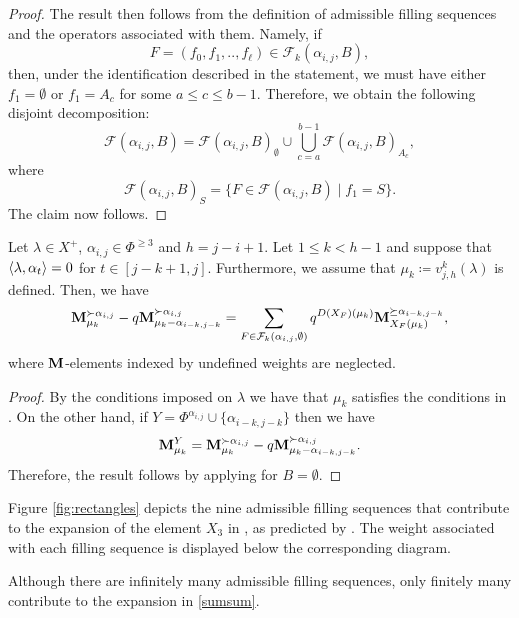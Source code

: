 \begin{proof}
The result then follows from the definition of admissible filling sequences and the operators associated with them. Namely, if
\[
F =(f_0,f_1, ..,f_{\ell})\in \mathcal{F}_k(\alpha_{i,j}, B),
\]
then, under the identification described in the statement, we must have either $f_1=\emptyset$ or $f_1=A_c$ for some $a\leq c \leq b-1$. 
Therefore, we obtain the following disjoint decomposition:
\begin{equation}
    \mathcal{F}(\alpha_{i,j},B) = \mathcal{F}(\alpha_{i,j},B)_{\emptyset} \cup \bigcup_{c=a}^{b-1} \mathcal{F}(\alpha_{i,j},B)_{A_c},  
\end{equation}
where
\[
\mathcal{F}(\alpha_{i,j},B)_{S}
=
\{ F\in \mathcal{F}(\alpha_{i,j},B) \mid f_1=S  \}.
\]
The claim now follows.
\end{proof}




\begin{proposition}\rm \label{prop: caso bueno}
 Let $\lambda \in X^{+}$, $\alpha_{i,j}\in \Phi^{\geq 3}$ and  $h=j-i+1$. 
    Let $1\leq k < h-1$ and suppose that $ \langle \lambda , \alpha_{t} \rangle =0$ for $t\in [j-k+1,j]$. 
    Furthermore, we assume that $\mu_k\coloneqq v^k_{j,h}(\lambda) $ is defined.
    Then, we have
    \begin{equation} \label{sumsum}
        \mathbf{M}_{\mu_k}^{\succ \alpha_{i,j}} - q\mathbf{M}_{\mu_k - \alpha_{i-k,j-k}}^{\succ \alpha_{i,j}} =  \sum_{F\in \mathcal{F}_k(\alpha_{i,j},\emptyset)} q^{D(X_F)(\mu_k)}\mathbf{M}_{X_F(\mu_k)}^{ \succeq \alpha_{i-k,j-k}   }, 
    \end{equation}   
    where $\mathbf{M}$-elements indexed by undefined weights are neglected. 
\end{proposition}

\begin{proof}
    By the conditions imposed on $\lambda$ we have that $\mu_k$ satisfies the conditions in . 
    On the other hand, if $Y=\Phi^{\alpha_{i,j}}\cup \{\alpha_{i-k,j-k}\}$ then we have
    \begin{equation}
        \mathbf{M}_{\mu_{k}}^Y  = \mathbf{M}_{\mu_k}^{\succ \alpha_{i,j}} - q\mathbf{M}_{\mu_k - \alpha_{i-k,j-k}}^{\succ \alpha_{i,j}} . 
    \end{equation}
    Therefore, the result follows by applying  for $B=\emptyset$. 
\end{proof}


\begin{example}\rm
Figure \ref{fig:rectangles} depicts the nine admissible filling sequences that contribute to the expansion of the element $X_3$ in , as predicted by .
The weight associated with each filling sequence is displayed below the corresponding diagram.

Although there are infinitely many admissible filling sequences, only finitely many contribute to the expansion in \eqref{sumsum}.
\end{example}


